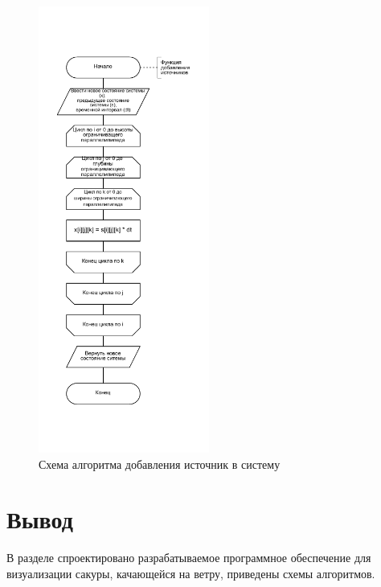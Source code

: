 \begin{figure}[H]
	\centering
	\includegraphics[width=0.5\textwidth, page=1]{assets/img/add_source.pdf}
	\caption{Схема алгоритма добавления источник в систему}
	\label{fig:add_src}
\end{figure}



\section*{Вывод}
В разделе спроектировано разрабатываемое программное обеспечение для визуализации сакуры, качающейся на ветру, приведены схемы алгоритмов.
